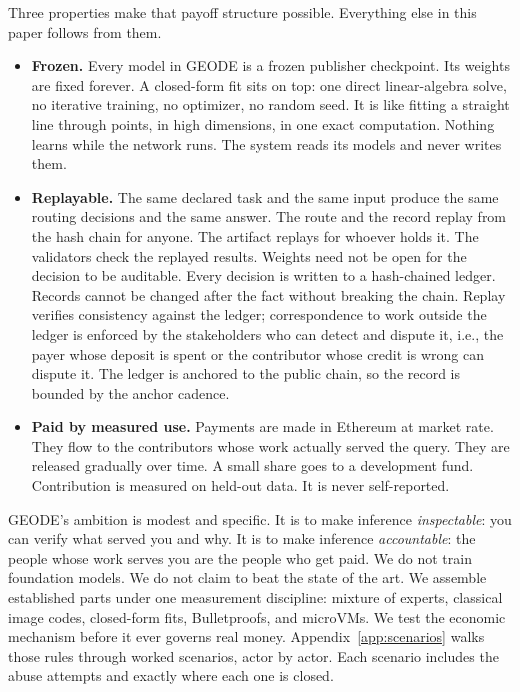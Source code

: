 \documentclass[11pt]{article}
\begin{document}
Three properties make that payoff structure possible. Everything
else in this paper follows from them.

\begin{itemize}
    \item \textbf{Frozen.} Every model in GEODE is a frozen publisher
          checkpoint. Its weights are fixed forever. A closed-form fit sits
          on top: one direct linear-algebra solve, no iterative training, no
          optimizer, no random seed. It is like fitting a straight line
          through points, in high dimensions, in one exact computation.
          Nothing learns while the network runs. The system reads its models
          and never writes them.
    \item \textbf{Replayable.} The same declared task and the same
          input produce the same routing decisions and the same answer. The
          route and the record replay from the hash chain for anyone. The
          artifact replays for whoever holds it. The validators check the
          replayed results. Weights need not be open for the decision to be
          auditable. Every decision is written to a hash-chained ledger.
          Records cannot be changed after the fact without breaking the
          chain. Replay verifies consistency against the ledger;
          correspondence to work outside the ledger is enforced by the
          stakeholders who can detect and dispute it, i.e., the payer whose
          deposit is spent or the contributor whose credit is wrong can dispute it. The ledger is anchored to the public chain, so the record is
          bounded by the anchor cadence.
    \item \textbf{Paid by measured use.} Payments are made in Ethereum
          at market rate. They flow to the contributors whose work actually
          served the query. They are released gradually over time. A small
          share goes to a development fund. Contribution is measured on
          held-out data. It is never self-reported.
\end{itemize}

GEODE's ambition is modest and specific. It is to make inference
\emph{inspectable}: you can verify what served you and why. It is
to make inference \emph{accountable}: the people whose work serves
you are the people who get paid. We do not train foundation
models. We do not claim to beat the state of the art. We assemble
established parts under one measurement
discipline: mixture of experts, classical image codes,
closed-form fits, Bulletproofs, and microVMs. We test the economic mechanism before it ever governs
real money. Appendix~\ref{app:scenarios} walks those rules through
worked scenarios, actor by actor. Each scenario includes the abuse
attempts and exactly where each one is closed.
\end{document}
